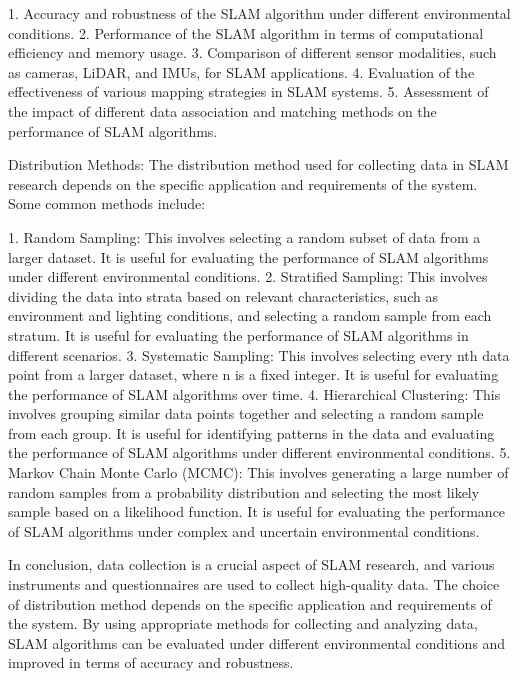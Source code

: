\documentclass[conference]{IEEEtran}
\begin{document}
1. Accuracy and robustness of the SLAM algorithm under different environmental conditions. \cite{khoo2019}
2. Performance of the SLAM algorithm in terms of computational efficiency and memory usage. \cite{zhang2020}
3. Comparison of different sensor modalities, such as cameras, LiDAR, and IMUs, for SLAM applications. \cite{lee2019}
4. Evaluation of the effectiveness of various mapping strategies in SLAM systems. \cite{khlifat2019}
5. Assessment of the impact of different data association and matching methods on the performance of SLAM algorithms. \cite{fu2019}

Distribution Methods:
The distribution method used for collecting data in SLAM research depends on the specific application and requirements of the system. Some common methods include:

1. Random Sampling: This involves selecting a random subset of data from a larger dataset. It is useful for evaluating the performance of SLAM algorithms under different environmental conditions. \cite{khoo2019}
2. Stratified Sampling: This involves dividing the data into strata based on relevant characteristics, such as environment and lighting conditions, and selecting a random sample from each stratum. It is useful for evaluating the performance of SLAM algorithms in different scenarios. \cite{zhang2020}
3. Systematic Sampling: This involves selecting every nth data point from a larger dataset, where n is a fixed integer. It is useful for evaluating the performance of SLAM algorithms over time. \cite{lee2019}
4. Hierarchical Clustering: This involves grouping similar data points together and selecting a random sample from each group. It is useful for identifying patterns in the data and evaluating the performance of SLAM algorithms under different environmental conditions. \cite{khlifat2019}
5. Markov Chain Monte Carlo (MCMC): This involves generating a large number of random samples from a probability distribution and selecting the most likely sample based on a likelihood function. It is useful for evaluating the performance of SLAM algorithms under complex and uncertain environmental conditions. \cite{fu2019}

In conclusion, data collection is a crucial aspect of SLAM research, and various instruments and questionnaires are used to collect high-quality data. The choice of distribution method depends on the specific application and requirements of the system. By using appropriate methods for collecting and analyzing data, SLAM algorithms can be evaluated under different environmental conditions and improved in terms of accuracy and robustness.
\end{document}
